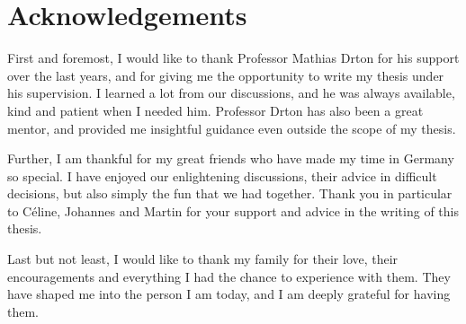 \section*{Acknowledgements}

First and foremost, I would like to thank Professor Mathias Drton for his support over the last years, and for giving me the opportunity to write my thesis under his supervision. I learned a lot from our discussions, and he was always available, kind and patient when I needed him. Professor Drton has also been a great mentor, and provided me insightful guidance even outside the scope of my thesis.

Further, I am thankful for my great friends who have made my time in Germany so special. I have enjoyed our enlightening discussions, their advice in difficult decisions, but also simply the fun that we had together. Thank you in particular to C\'eline, Johannes and Martin for your support and advice in the writing of this thesis.   

Last but not least, I would like to thank my family for their love, their encouragements and everything I had the chance to experience with them. They have shaped me into the person I am today, and I am deeply grateful for having them.

